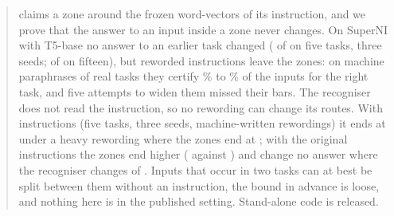 \begin{abstract}
claims a zone around the frozen word-vectors of its instruction, and we prove that the answer to an
input inside a zone never changes. On SuperNI with T5-base no answer to an earlier task changed
(\FiveCertChanged{} of \FiveCertCompared{} on five tasks, three seeds; \FifteenCertChanged{} of
\FifteenCertCompared{} on fifteen), but reworded instructions leave the zones: on machine
paraphrases of \WidenTasksEval{} real tasks they certify \WidenRefTfivePLow{}\% to
\WidenRefTfivePHigh{}\% of the inputs for the right task, and five attempts to widen them missed
their bars. The recogniser does not read the instruction, so no rewording can change its routes.
With instructions (five tasks, three seeds, machine-written rewordings) it ends
at \AudUThreeHeavyRidgeAPOne{} under a heavy rewording where the zones end at \AudUThreeHeavyCertAPOne{}; with
the original instructions the zones end higher (\AudUThreeOriginalCertAPOne{} against
\AudUThreeOriginalRidgeAPOne{}) and change no answer where the recogniser changes
\AudUThreeOriginalRidgeChanged{} of \AudUThreeCompared{}. Inputs that occur in two tasks can at best be split between them without an
instruction, the bound in advance is loose, and nothing here is in the published setting.
Stand-alone code is released.
\end{abstract}
